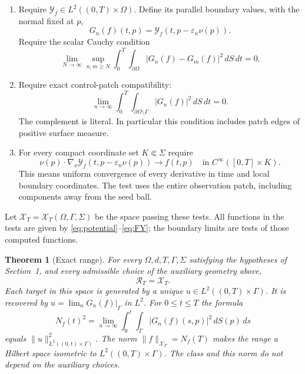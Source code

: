 \documentclass[11pt]{article}
\newtheorem{theorem}{Theorem}[section]
\theoremstyle{remark}
\newcommand{\Om}{\Omega}
\newcommand{\calX}{\mathcal X}
\newcommand{\calR}{\mathcal R}
\newcommand{\calF}{\mathcal F}
\newcommand{\calY}{\mathcal Y}
\begin{document}
\begin{enumerate}[label=\textnormal{(\Alph*)},leftmargin=*]
When this test passes, define the explicitly computed functions
\begin{equation}\label{eq:FY}
 \calF_f(x,t)=\sum_\alpha c^{(j)}_\alpha(t)(x-q_j)^\alpha
       \quad(x\in B(q_j,r_j)),\qquad
 \calY_f=V_f-\calF_f\quad\text{on $\Om$.}
\end{equation}
The first definition is independent of the covering ball.
\item\label{test:C}
Require $\calY_f\in L^2((0,T)\times\Om)$.
Define its parallel boundary values, with the normal fixed at $p$,
\begin{equation}\label{eq:Gn}
 G_n(f)(t,p)=\calY_f(t,p-\varepsilon_n\nu(p)).
\end{equation}
Require the scalar Cauchy condition
\begin{equation}\label{eq:cauchy}
 \lim_{N\to\infty}\sup_{n,m\geq N}
 \int_0^T\int_{\partial\Om}|G_n(f)-G_m(f)|^2\,dS\,dt=0.
\end{equation}
\item\label{test:D}
Require exact control-patch compatibility:
\begin{equation}\label{eq:support}
 \lim_{n\to\infty}
 \int_0^T\int_{\partial\Om\setminus\Gamma}|G_n(f)|^2\,dS\,dt=0.
\end{equation}
The complement is literal. In particular this condition includes patch
edges of positive surface measure.
\item\label{test:E}
For every compact coordinate set $K\Subset\Sigma$ require
\begin{equation}\label{eq:observation}
 \nu(p)\cdot\nabla_x\calY_f(t,p-\varepsilon_n\nu(p))
          \longrightarrow f(t,p)
       \quad\text{in }C^\infty([0,T]\times K).
\end{equation}
This means uniform convergence of every derivative in time and local
boundary coordinates. The test uses the entire observation patch,
including components away from the seed ball.
\end{enumerate}
Let $\calX_T=\calX_T(\Om,\Gamma,\Sigma)$ be the space passing these tests.
All functions in the tests are given by \eqref{eq:potential}--\eqref{eq:FY};
the boundary limits are tests of those computed functions.

\begin{theorem}[Exact range]\label{thm:range}
For every $\Om,d,T,\Gamma,\Sigma$ satisfying the hypotheses of
Section~1, and every admissible choice of the auxiliary geometry above,
\[
 \calR_T=\calX_T.
\]
Each target in this space is generated by a unique
$u\in L^2((0,T)\times\Gamma)$. It is recovered by
$u=\lim_n G_n(f)|_\Gamma$ in $L^2$.
For $0\leq t\leq T$ the formula
\begin{equation}\label{eq:N}
 N_f(t)^2=\lim_{n\to\infty}
              \int_0^t\int_\Gamma|G_n(f)(s,p)|^2\,dS(p)\,ds
\end{equation}
equals $\|u\|_{L^2((0,t)\times\Gamma)}^2$.
The norm $\|f\|_{\calX_T}=N_f(T)$ makes the range a Hilbert space
isometric to $L^2((0,T)\times\Gamma)$.
The class and this norm do not depend on the auxiliary choices.
\end{theorem}
\end{document}

